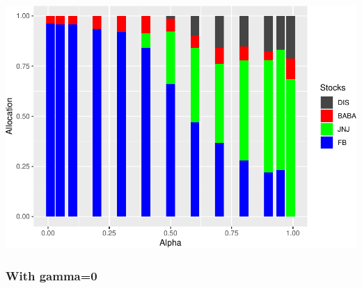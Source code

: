 \documentclass[]{article}
\begin{document}
\includegraphics{Integrated_Management_Formulation_Model_files/figure-latex/unnamed-chunk-7-2.pdf}

\subsubsection{With gamma=0}\label{with-gamma0}
\end{document}
